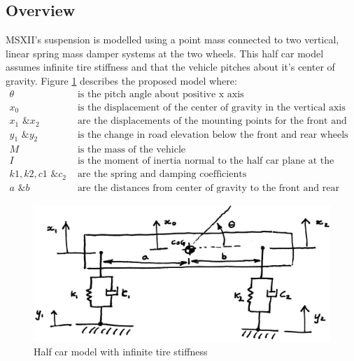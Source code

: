 \documentclass[12pt]{article}
\begin{document}
\subsection{Overview}
MSXII's suspension is modelled using a point mass connected to two vertical, linear spring mass damper systems at the two wheels. This half car model assumes infinite tire stiffness and that the vehicle pitches about it's center of gravity. Figure \ref{fig:systemModel} describes the proposed model where: 
\begin{align*}
	\theta & \text{ is the pitch angle about positive x axis}\\        
	x_0 & \text{ is the displacement of the center of gravity in the vertical axis} \\
	x_1 \text{ \& } x_2 & \text{ are the displacements of the mounting points for the front and rear wheels respectively} \\
	y_1 \text{ \& } y_2 & \text{ is the change in road elevation below the front  and rear wheels respectively} \\
	M & \text{ is the mass of the vehicle} \\
	I & \text{ is the moment of inertia normal to the half car plane at the center of gravity} \\
	k1,k2,c1 \text{ \& } c_2 & \text{ are the spring and damping coefficients} \\
	a \text{ \& } b & \text{ are the distances from center of gravity to the front and rear wheels respectively}
\end{align*}
\begin{figure}[h!]
	\centering
	\label{fig:systemModel}
	\includegraphics[width=.8\textwidth]{./LaTex/systemModel.jpg}
	\caption{Half car model with infinite tire stiffness}
\end{figure}
\end{document}
